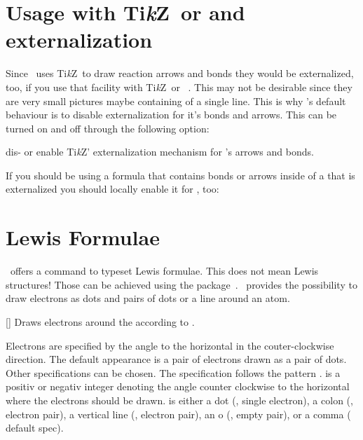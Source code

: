 \documentclass[load-preamble+]{cnltx-doc}
\newcommand*\TikZ{Ti\textit{k}Z}
\begin{document}
\section{Usage with \TikZ\ or  and externalization}
Since \chemformula\ uses \TikZ\ to draw reaction arrows
and bonds they would be externalized, too, if you use that facility with
\TikZ\ or ~\cite{pkg:pgfplots}.  This may not be
desirable since they are very small pictures maybe containing of a single
line.  This is why \chemformula's default behaviour is to disable
externalization for it's bonds and arrows.  This can be turned on and off
through the following option:
\begin{options}
    dis- or enable \TikZ' externalization mechanism for \chemformula's arrows
    and bonds.
\end{options}

If you should be using a formula that contains bonds or arrows inside of a
 that is externalized you should locally enable it for
\chemformula, too:

\begin{sourcecode}
\end{sourcecode}

\section{Lewis Formulae}\label{sec:lewis-formulae}
\chemformula\ offers a command to typeset Lewis formulae.
This does not mean Lewis structures!  Those can be achieved using the
 package~\cite{pkg:chemfig}.  \chemformula\ provides the
possibility to draw electrons as dots and pairs of dots or a line around an
atom.

\begin{commands}
  []
    Draws electrons around the  according to .
\end{commands}

Electrons are specified by the angle to the horizontal in the couter-clockwise
direction.  The default appearance is a pair of electrons drawn as a pair of
dots.  Other specifications can be chosen.  The specification follows the
pattern .   is a positiv or negativ
integer denoting the angle counter clockwise to the horizontal where the
electrons should be drawn.   is either a dot (, single
electron), a colon (\code{:}, electron pair), a vertical line (\code{|},
electron pair), an o (, empty pair), or a comma (\code{,} default
spec).
\end{document}

